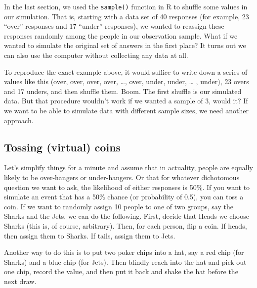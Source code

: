 \documentclass[
  openany]{book}
\begin{document}
In the last section, we used the \texttt{sample()} function in R to shuffle some values in our simulation. That is, starting with a data set of 40 responses (for example, 23 ``over'' responses and 17 ``under'' responses), we wanted to reassign these responses randomly among the people in our observation sample. What if we wanted to simulate the original set of answers in the first place? It turns out we can also use the computer without collecting any data at all.

To reproduce the exact example above, it would suffice to write down a series of values like this (over, over, over, over, \ldots, over, under, under, \ldots{} , under), 23 overs and 17 unders, and then shuffle them. Boom. The first shuffle is our simulated data. But that procedure wouldn't work if we wanted a sample of 3, would it? If we want to be able to simulate data with different sample sizes, we need another approach.

\hypertarget{tossing-virtual-coins}{%
\subsection*{Tossing (virtual) coins}\label{tossing-virtual-coins}}

Let's simplify things for a minute and assume that in actuality, people are equally likely to be over-hangers or under-hangers. Or that for whatever dichotomous question we want to ask, the likelihood of either responses is 50\%.
If you want to simulate an event that has a 50\% chance (or probability of 0.5), you can toss a coin. If we want to randomly assign 10 people to one of two groups, say the Sharks and the Jets, we can do the following. First, decide that Heads we choose Sharks (this is, of course, arbitrary). Then, for each person, flip a coin. If heads, then assign them to Sharks. If tails, assign them to Jets.

Another way to do this is to put two poker chips into a hat, say a red chip (for Sharks) and a blue chip (for Jets). Then blindly reach into the hat and pick out one chip, record the value, and then put it back and shake the hat before the next draw.
\end{document}
